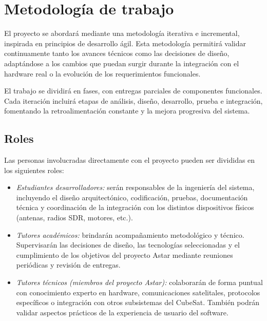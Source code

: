 
\section*{Metodología de trabajo}

El proyecto se abordará mediante una metodología iterativa e incremental, inspirada en principios de desarrollo ágil. Esta metodología permitirá validar continuamente tanto los avances técnicos como las decisiones de diseño, adaptándose a los cambios que puedan surgir durante la integración con el hardware real o la evolución de los requerimientos funcionales.

El trabajo se dividirá en fases, con entregas parciales de componentes funcionales. Cada iteración incluirá etapas de análisis, diseño, desarrollo, prueba e integración, fomentando la retroalimentación constante y la mejora progresiva del sistema.

\subsection*{Roles}

Las personas involucradas directamente con el proyecto pueden ser divididas en los siguientes roles:

\begin{itemize}
    \item \textit{Estudiantes desarrolladores:} serán responsables de la ingeniería del sistema, incluyendo el diseño arquitectónico, codificación, pruebas, documentación técnica y coordinación de la integración con los distintos dispositivos físicos (antenas, radios SDR, motores, etc.).
    
    \item \textit{Tutores académicos:} brindarán acompañamiento metodológico y técnico. Supervisarán las decisiones de diseño, las tecnologías seleccionadas y el cumplimiento de los objetivos del proyecto Astar mediante reuniones periódicas y revisión de entregas.
    
    \item \textit{Tutores técnicos (miembros del proyecto Astar):} colaborarán de forma puntual con conocimiento experto en hardware, comunicaciones satelitales, protocolos específicos o integración con otros subsistemas del CubeSat. También podrán validar aspectos prácticos de la experiencia de usuario del software.
\end{itemize}
    
